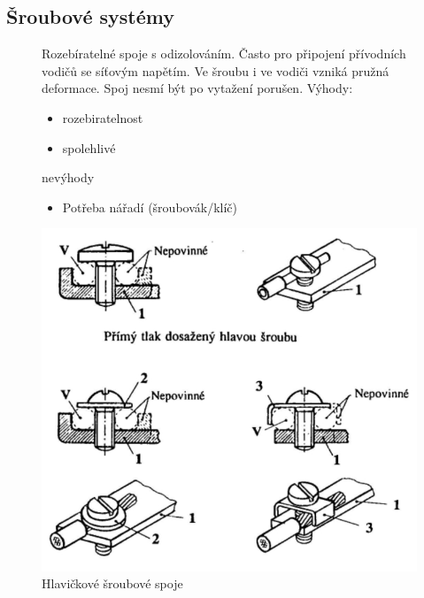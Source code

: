 \documentclass{article}
\begin{document}
\subsection{Šroubové systémy}
\begin{figure}[H]
  \begin{minipage}[r]{0.55\textwidth}
    \vspace{-15mm}
    Rozebíratelné spoje s odizolováním.
    Často pro připojení přívodních vodičů se síťovým napětím.
    Ve šroubu i ve vodiči vzniká pružná deformace.
    Spoj nesmí být po vytažení porušen. 
    Výhody:
    \begin{itemize}
      \item rozebiratelnost
      \item spolehlivé
    \end{itemize}
    nevýhody
    \begin{itemize}
      \item Potřeba nářadí (šroubovák/klíč)
    \end{itemize}
  \end{minipage}
  \hfil
  \begin{minipage}[r]{0.4\textwidth}
    \vspace{-15mm}
    \centering
    \includegraphics[width=\textwidth]{sroubovatko3.png}
    \caption{Hlavičkové šroubové spoje}
  \end{minipage}
\end{figure}
\end{document}
